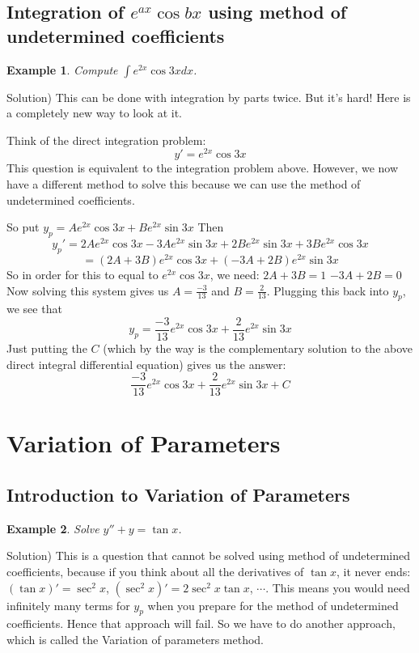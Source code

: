 \documentclass[12pt]{report}
\newtheorem{ex}{Example}[section]
\begin{document}
\subsection*{ Integration of $e^{ax} \cos bx$ using method of undetermined coefficients }

\begin{ex}
Compute $\int e^{2x} \cos{3x} dx$.
\end{ex}

Solution) This can be done with integration by parts twice. But it's hard!
Here is a completely new way to look at it.

Think of the direct integration problem:
$$y' = e^{2x} \cos{3x} $$
This question is equivalent to the integration problem above. However, we now have a different method to solve this because we can use the method of undetermined coefficients.

So put $y_p = A e^{2x} \cos{3x}+ B e^{2x} \sin{3x} $
Then
$$y_p' = 2 A e^{2x} \cos{3x} -3A e^{2x} \sin{3x}+ 2B e^{2x} \sin{3x}+ 3B e^{2x} \cos{3x} $$
$$ = (2A+3B) e^{2x} \cos{3x} + (-3A + 2B) e^{2x} \sin{3x}$$
So in order for this to equal to $e^{2x} \cos{3x} $, we need:
$2A + 3B=1$
$-3A + 2B=0 $
Now solving this system gives us $A=\frac{-3}{13}$ and $B= \frac{2}{13}$. Plugging this back into $y_p$, we see that
$$y_p = \frac{-3}{13} e^{2x} \cos{3x}+ \frac{2}{13} e^{2x} \sin{3x} $$
Just putting the $C$ (which by the way is the complementary solution to the above direct integral differential equation) gives us the answer:
$$\frac{-3}{13} e^{2x} \cos{3x}+ \frac{2}{13} e^{2x} \sin{3x} +C $$

\section{Variation of Parameters}

\subsection*{ Introduction to Variation of Parameters}
\begin{ex}
Solve $y''+y=\tan x$.
\end{ex}

Solution) This is a question that cannot be solved using method of undetermined coefficients, because if you think about all the derivatives of $\tan x$, it never ends:
$(\tan x)'= \sec^2 x $, $(\sec^2 x)' = 2\sec^2 x \tan x$, $\cdots$. This means you would need infinitely many terms for $y_p$ when you prepare for the method of undetermined coefficients. Hence that approach will fail. So we have to do another approach, which is called the Variation of parameters method.
\end{document}
